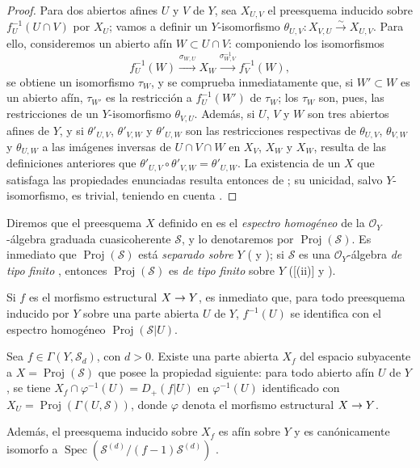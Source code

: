 \documentclass[oneside,10pt]{amsart}
\makeatletter
\newcommand{\ega@arrow}[2]{\mathchoice{#1}{#2}{#2}{#2}}
\renewcommand{\to}{\ega@arrow{\longrightarrow}{\rightarrow}}
\newcommand{\oldpage}[2][]{\marginnote{\normalfont\footnotesize\textbf{#1}~|~#2}\ignorespaces}
\let\EGAOriginalLabel\label
\renewcommand{\label}[1]{\phantomsection\EGAOriginalLabel{#1}}
\makeatother
\begin{document}
\begin{proof}
Para dos abiertos afines $U$ y $V$ de $Y$, sea $X_{U,V}$ el preesquema inducido sobre $f_U^{-1}(U\cap V)$ por $X_U$; vamos a definir un $Y$-isomorfismo $\theta_{U,V}:X_{V,U}\xrightarrow{\sim}X_{U,V}$.
Para ello, consideremos un abierto afín $W\subset U\cap V$: componiendo los isomorfismos
\[
  f_U^{-1}(W)\xrightarrow{\sigma_{W,U}}X_W
  \xrightarrow{\sigma_{W,V}^{-1}}f_V^{-1}(W),
\]
se obtiene un isomorfismo $\tau_W$, y se comprueba inmediatamente que, si $W'\subset W$ es un abierto afín, $\tau_{W'}$ es la restricción a $f_U^{-1}(W')$ de $\tau_W$; los $\tau_W$ son, pues, las restricciones de un $Y$-isomorfismo $\theta_{V,U}$.
Además, si $U$, $V$ y $W$ son tres abiertos afines de $Y$, y si $\theta'_{U,V}$, $\theta'_{V,W}$ y $\theta'_{U,W}$ son las restricciones respectivas de $\theta_{U,V}$, $\theta_{V,W}$ y $\theta_{U,W}$ a las imágenes inversas de $U\cap V\cap W$ en $X_V$, $X_W$ y $X_W$, resulta de las definiciones anteriores que $\theta'_{U,V}\circ\theta'_{V,W}=\theta'_{U,W}$.
La existencia de un $X$ que satisfaga las propiedades enunciadas resulta entonces de ; su unicidad, salvo $Y$-isomorfismo, es trivial, teniendo en cuenta .
\end{proof}

\begin{env}[3.1.3]
\label{II.3.1.3-fr}
Diremos que el preesquema $X$ definido en  es el \emph{espectro homogéneo} de la $\mathcal{O}_Y$-álgebra graduada cuasicoherente $\mathcal{S}$, y lo denotaremos por $\operatorname{Proj}(\mathcal{S})$.
Es inmediato que $\operatorname{Proj}(\mathcal{S})$ está \emph{separado sobre $Y$} ( y ); si $\mathcal{S}$ es una $\mathcal{O}_Y$-álgebra \emph{de tipo finito} , entonces $\operatorname{Proj}(\mathcal{S})$ es \emph{de tipo finito} sobre $Y$ ([(ii)] y ).

Si $f$ es el morfismo estructural $X\to Y$, es inmediato que, para todo preesquema inducido por $Y$ sobre una parte abierta $U$ de $Y$, $f^{-1}(U)$ se identifica con el espectro homogéneo $\operatorname{Proj}(\mathcal{S}|U)$.
\end{env}

\begin{proposition}[3.1.4]
\label{II.3.1.4-fr}
Sea $f\in\Gamma(Y,\mathcal{S}_d)$, con $d>0$.
Existe una parte abierta $X_f$ del espacio subyacente a $X=\operatorname{Proj}(\mathcal{S})$ que posee la propiedad siguiente: para todo abierto afín $U$ de $Y$, se tiene
\oldpage[II]{51}
 $X_f\cap\varphi^{-1}(U)=D_+(f|U)$ en $\varphi^{-1}(U)$ identificado con $X_U=\operatorname{Proj}(\Gamma(U,\mathcal{S}))$, donde $\varphi$ denota el morfismo estructural $X\to Y$.

Además, el preesquema inducido sobre $X_f$ es afín sobre $Y$ y es canónicamente isomorfo a $\operatorname{Spec}(\mathcal{S}^{(d)}/(f-1)\mathcal{S}^{(d)})$ .
\end{proposition}
\end{document}
